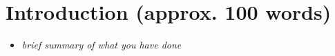 \section{Introduction (approx. 100 words)}
\begin{itemize}
    \item \textit{brief  summary of what you have done}
\end{itemize}